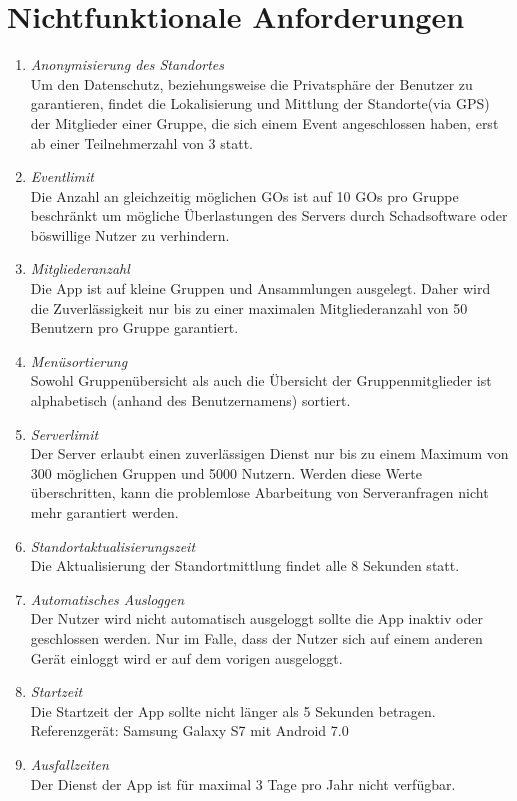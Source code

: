 \documentclass[parskip=full]{scrartcl}
\def\threedigits#1{%
  \ifnum#1<100 0\fi
  \ifnum#1<10 0\fi
  \number#1}
\begin{document}
\section{Nichtfunktionale Anforderungen}
\begin{enumerate}[label={\textbf{/NF\protect\threedigits{\theenumi}0/}}, leftmargin=*]
		\item \textit{Anonymisierung des Standortes} \\
		Um den Datenschutz, beziehungsweise die Privatsphäre der Benutzer zu garantieren, findet die Lokalisierung und Mittlung der Standorte(via GPS) der Mitglieder einer Gruppe, die sich einem Event angeschlossen haben, erst ab einer Teilnehmerzahl von 3 statt. 
		
		\item \textit{Eventlimit} \\
		Die Anzahl an gleichzeitig möglichen GOs ist auf 10 GOs pro Gruppe beschränkt um mögliche Überlastungen des Servers durch Schadsoftware oder böswillige Nutzer zu verhindern.
		
		\item \textit{Mitgliederanzahl} \\
		Die App ist auf kleine Gruppen und Ansammlungen ausgelegt. Daher wird die Zuverlässigkeit nur bis zu einer maximalen Mitgliederanzahl von 50 Benutzern pro Gruppe garantiert.
		
		\item \textit{Menüsortierung} \\
		Sowohl Gruppenübersicht als auch die Übersicht der Gruppenmitglieder ist alphabetisch (anhand des Benutzernamens) sortiert. 
		
		\item \textit{Serverlimit} \\
		Der Server erlaubt einen zuverlässigen Dienst nur bis zu einem Maximum von 300 möglichen Gruppen und 5000 Nutzern. Werden diese Werte überschritten, kann die problemlose Abarbeitung von Serveranfragen nicht mehr garantiert werden.
		
		\item \textit{Standortaktualisierungszeit} \\
		Die Aktualisierung der Standortmittlung findet alle 8 Sekunden statt.
		
		\item \textit{Automatisches Ausloggen} \\
		Der Nutzer wird nicht automatisch ausgeloggt sollte die App inaktiv oder geschlossen werden. Nur im Falle, dass der Nutzer sich auf einem anderen Gerät einloggt wird er auf dem vorigen ausgeloggt.
		
		\item \textit{Startzeit} \\
		Die Startzeit der App sollte nicht länger als 5 Sekunden betragen. \\
		Referenzgerät: Samsung Galaxy S7 mit Android 7.0
		
		\item \textit{Ausfallzeiten} \\
		Der Dienst der App ist für maximal 3 Tage pro Jahr nicht verfügbar.
		
\end{enumerate}
\end{document}
